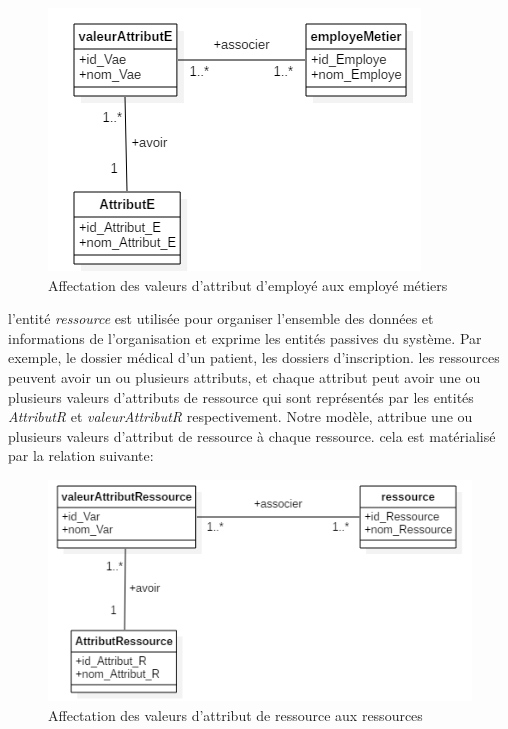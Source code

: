 \begin{figure}[h!]
    \centering
		\includegraphics[scale=0.7]{chap3/images/employe_attribut.png}
    \caption{Affectation des valeurs d'attribut d'employé aux employé métiers}
	 \label{figemploye}
\end{figure} 

\label{sectionRessource}

l'entité \textit{ressource} est utilisée pour organiser l'ensemble des données et informations de l'organisation et exprime les entités passives du système. Par exemple, le dossier médical d'un patient, les dossiers d'inscription. les ressources peuvent avoir un ou plusieurs attributs, et chaque attribut peut avoir une ou plusieurs valeurs d'attributs de ressource qui sont représentés par les entités \textit{AttributR} et \textit{valeurAttributR} respectivement. Notre modèle, attribue une ou plusieurs valeurs d'attribut de ressource à chaque ressource. cela est matérialisé par la relation suivante:

\begin{figure}[h!]
    \centering
		\includegraphics[scale=0.7]{chap3/images/ressource_attribut.png}
    \caption{Affectation des valeurs d'attribut de ressource aux ressources}
	 \label{figressource}
\end{figure} 

